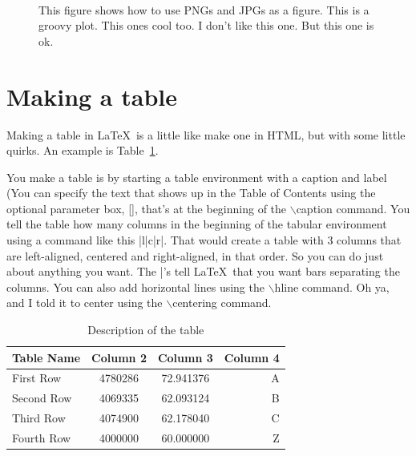 \begin{figure}[hhhhhtb]
{    \label{subfig:overview2_c}
  } \quad
   \\
  \caption[Cool Figure from Chapter 2 made with the subfigure package]{
  This figure shows how to use PNGs and JPGs as a figure.
   This is a groovy plot.
   This ones cool too.
   I don't like this one.
   But this one is ok.}
  \label{fig:overview2}
\end{figure}


\section{Making a table}
Making a table in \LaTeX\ is a little like make one in HTML, but
with some little quirks. An example is Table~\ref{tab:comparison}.

You make a table is by starting a table environment with a caption
and label (You can specify the text that shows up in the Table of
Contents using the optional parameter box, [], that's at the
beginning of the $\backslash$caption command. You tell the table how
many columns in the beginning of the tabular environment using a
command like this |l|c|r|. That would create a table with 3 columns
that are left-aligned, centered and right-aligned, in that order. So
you can do just about anything you want. The |'s tell \LaTeX\ that
you want bars separating the columns. You can also add horizontal
lines using the $\backslash$hline command. Oh ya, and I told it to
center using the $\backslash$centering command.


\begin{table}[hhhhtbp]
\centering
\caption[Example Table]{Description of the table}
\label{tab:comparison}
%
\begin{tabular}{|l|c|c|r|}
\hline

Table Name  & Column 2 & Column 3   & Column 4 \\
\hline
First Row   & 4780286  & 72.941376  & A \\
Second Row  & 4069335  & 62.093124  & B \\
Third Row   & 4074900  & 62.178040  & C \\
\hline
Fourth Row  & 4000000  & 60.000000  & Z \\
\hline

\end{tabular}
\end{table}
